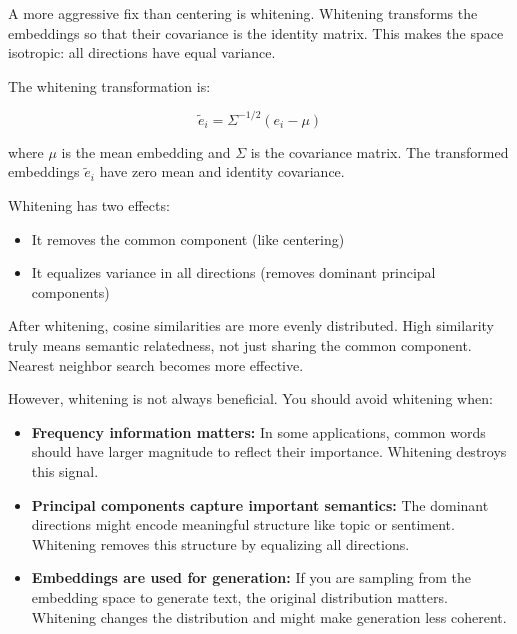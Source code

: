 A more aggressive fix than centering is whitening. Whitening transforms the embeddings so that their covariance is the identity matrix. This makes the space isotropic: all directions have equal variance.

The whitening transformation is:

\begin{equation}
\tilde{e}_i = \Sigma^{-1/2}(e_i - \mu)
\end{equation}

where $\mu$ is the mean embedding and $\Sigma$ is the covariance matrix. The transformed embeddings $\tilde{e}_i$ have zero mean and identity covariance.

\vspace{1em}

Whitening has two effects:

\begin{itemize}
\item It removes the common component (like centering)
\item It equalizes variance in all directions (removes dominant principal components)
\end{itemize}

\vspace{1em}

After whitening, cosine similarities are more evenly distributed. High similarity truly means semantic relatedness, not just sharing the common component. Nearest neighbor search becomes more effective.

\vspace{1em}

However, whitening is not always beneficial. You should avoid whitening when:

\begin{itemize}
\item \textbf{Frequency information matters:} In some applications, common words should have larger magnitude to reflect their importance. Whitening destroys this signal.

\item \textbf{Principal components capture important semantics:} The dominant directions might encode meaningful structure like topic or sentiment. Whitening removes this structure by equalizing all directions.

\item \textbf{Embeddings are used for generation:} If you are sampling from the embedding space to generate text, the original distribution matters. Whitening changes the distribution and might make generation less coherent.
\end{itemize}

